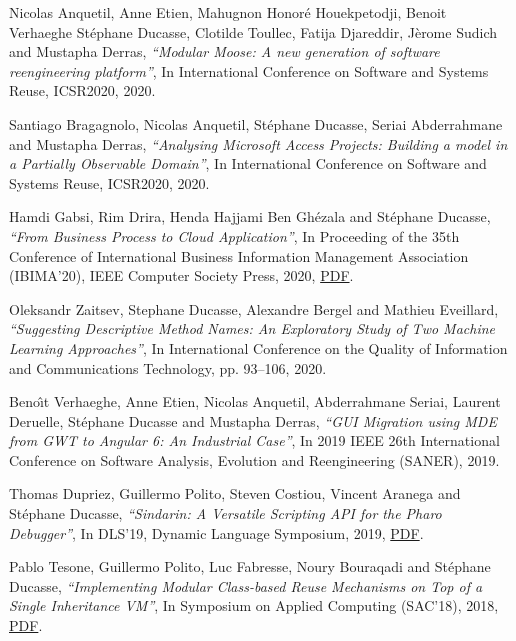 \documentclass{article}
\newcommand{\czauthors}[1]{#1}
\newcommand{\cztitle}[1]{\emph{``#1''}}
\newcommand{\czbooktitle}[1]{#1}
\begin{document}
\begin{itemize}

	\pub  \czauthors{Nicolas Anquetil, Anne Etien, Mahugnon Honor\'e Houekpetodji, Benoit Verhaeghe St\'ephane Ducasse, Clotilde Toullec, Fatija Djareddir, J\`erome Sudich and Mustapha Derras},  \cztitle{Modular Moose:  A new generation of software reengineering platform},  In \czbooktitle{International Conference on Software and Systems Reuse, ICSR2020}, 2020.

	\pub  \czauthors{Santiago Bragagnolo, Nicolas Anquetil, St\'ephane Ducasse, Seriai Abderrahmane and Mustapha Derras},  \cztitle{Analysing Microsoft Access Projects: Building a model in a Partially Observable Domain},  In \czbooktitle{International Conference on Software and Systems Reuse, ICSR2020}, 2020.

	\pub  \czauthors{Hamdi Gabsi, Rim Drira, Henda Hajjami Ben Gh\'ezala and St\'ephane Ducasse},  \cztitle{From Business Process to Cloud Application},  In \czbooktitle{Proceeding of the 35th Conference of International Business Information Management Association (IBIMA'20)}, IEEE Computer Society Press, 2020, \href{http://rmod-files.lille.inria.fr/Team/Texts/Papers/Gabs20-FromBusinessProcesstoCloudApplication-IBIMA2020.pdf}{PDF}.

	\pub  \czauthors{Oleksandr Zaitsev, Stephane Ducasse, Alexandre Bergel and Mathieu Eveillard},  \cztitle{Suggesting Descriptive Method Names: An Exploratory Study of Two Machine Learning Approaches},  In \czbooktitle{International Conference on the Quality of Information and Communications Technology}, pp. 93--106, 2020.

	\pub  \czauthors{Beno{\^\i}t Verhaeghe, Anne Etien, Nicolas Anquetil, Abderrahmane Seriai, Laurent Deruelle, St\'ephane Ducasse and Mustapha Derras},  \cztitle{{GUI} Migration using {MDE} from {GWT} to {Angular} 6: An Industrial Case},  In \czbooktitle{2019 IEEE 26th International Conference on Software Analysis, Evolution and Reengineering (SANER)}, 2019.

	\pub  \czauthors{Thomas Dupriez, Guillermo Polito, Steven Costiou, Vincent Aranega and St\'ephane Ducasse},  \cztitle{Sindarin: A Versatile Scripting API for the Pharo Debugger},  In \czbooktitle{DLS'19, Dynamic Language Symposium}, 2019, \href{http://rmod-files.lille.inria.fr/Team/Texts/Papers/Dupr19a-DLS2019-Official.pdf}{PDF}.

	\pub  \czauthors{Pablo Tesone, Guillermo Polito, Luc Fabresse, Noury Bouraqadi and St\'ephane Ducasse},  \cztitle{Implementing Modular Class-based Reuse Mechanisms on Top of a Single Inheritance VM},  In \czbooktitle{Symposium on Applied Computing (SAC'18)}, 2018, \href{http://rmod-files.lille.inria.fr/Team/Texts/Papers/Teso18a-SAC-ExtensibleMetaclasses.pdf}{PDF}.


\end{itemize}
\end{document}
